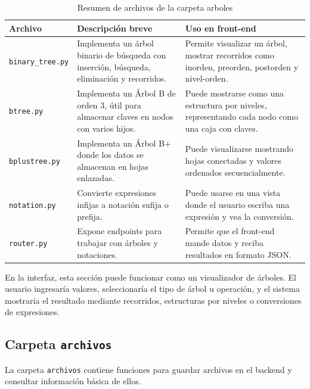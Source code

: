 \documentclass[12pt]{article}
\begin{document}
	\begin{table}[H]
		\centering
		\begin{tabular}{|p{4cm}|p{5cm}|p{5cm}|}
			\hline
			\textbf{Archivo} & \textbf{Descripción breve} & \textbf{Uso en front-end} \\
			\hline
			\texttt{binary\_tree.py} & Implementa un árbol binario de búsqueda con inserción, búsqueda, eliminación y recorridos. & Permite visualizar un árbol, mostrar recorridos como inorden, preorden, postorden y nivel-orden. \\
			\hline
			\texttt{btree.py} & Implementa un Árbol B de orden 3, útil para almacenar claves en nodos con varios hijos. & Puede mostrarse como una estructura por niveles, representando cada nodo como una caja con claves. \\
			\hline
			\texttt{bplustree.py} & Implementa un Árbol B+ donde los datos se almacenan en hojas enlazadas. & Puede visualizarse mostrando hojas conectadas y valores ordenados secuencialmente. \\
			\hline
			\texttt{notation.py} & Convierte expresiones infijas a notación sufija o prefija. & Puede usarse en una vista donde el usuario escriba una expresión y vea la conversión. \\
			\hline
			\texttt{router.py} & Expone endpoints para trabajar con árboles y notaciones. & Permite que el front-end mande datos y reciba resultados en formato JSON. \\
			\hline
		\end{tabular}
		\caption{Resumen de archivos de la carpeta arboles}
	\end{table}
	
	En la interfaz, esta sección puede funcionar como un visualizador de árboles. El usuario ingresaría valores, seleccionaría el tipo de árbol u operación, y el sistema mostraría el resultado mediante recorridos, estructuras por niveles o conversiones de expresiones.
	
	\subsection{Carpeta \texttt{archivos}}
	
	La carpeta \texttt{archivos} contiene funciones para guardar archivos en el backend y consultar información básica de ellos.
	
\end{document}
